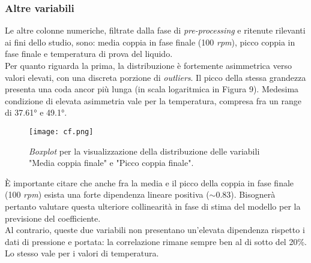 \documentclass[fleqn,10pt]{SelfArx} %
\begin{document}
\subsubsection{Altre variabili}
Le altre colonne numeriche, filtrate dalla fase di \textit{pre-processing} e ritenute rilevanti ai fini dello studio, sono: media coppia in fase finale (100 \textit{rpm}), picco coppia in fase finale e temperatura di prova del liquido.\\
Per quanto riguarda la prima, la distribuzione è fortemente asimmetrica verso valori elevati, con una discreta porzione di \textit{outliers}. Il picco della stessa grandezza presenta una coda ancor più lunga (in scala logaritmica in Figura 9). Medesima condizione di elevata asimmetria vale per la temperatura, compresa fra un range di 37.61° e 49.1°.
\begin{figure}[h]
    \centering
    \texttt{[image: cf.png]}
    \label{fig:em}
    \caption{\textit{Boxplot} per la visualizzazione della distribuzione delle variabili "Media coppia finale" e "Picco coppia finale".}
\end{figure}
È importante citare che anche fra la media e il picco della coppia in fase finale (100 \textit{rpm}) esista una forte dipendenza lineare positiva ($\sim$0.83). Bisognerà pertanto valutare questa ulteriore collinearità in fase di stima del modello per la previsione del coefficiente.\\
Al contrario, queste due variabili non presentano un'elevata dipendenza rispetto i dati di pressione e portata: la correlazione rimane sempre ben al di sotto del 20\%. Lo stesso vale per i valori di temperatura.
\end{document}
